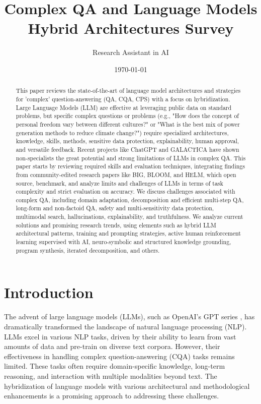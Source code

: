 \documentclass{article}
\title{Complex QA and Language Models Hybrid Architectures Survey}
\author{Research Assistant in AI }
\date{\today}
\begin{document}
\maketitle

\begin{abstract}
This paper reviews the state-of-the-art of language model architectures and strategies for 'complex' question-answering (QA, CQA, CPS) with a focus on hybridization. Large Language Models (LLM) are effective at leveraging public data on standard problems, but specific complex questions or problems (e.g., "How does the concept of personal freedom vary between different cultures?" or "What is the best mix of power generation methods to reduce climate change?") require specialized architectures, knowledge, skills, methods, sensitive data protection, explainability, human approval, and versatile feedback. Recent projects like ChatGPT and GALACTICA have shown non-specialists the great potential and strong limitations of LLMs in complex QA. This paper starts by reviewing required skills and evaluation techniques, integrating findings from community-edited research papers like BIG, BLOOM, and HELM, which open source, benchmark, and analyze limits and challenges of LLMs in terms of task complexity and strict evaluation on accuracy. We discuss challenges associated with complex QA, including domain adaptation, decomposition and efficient multi-step QA, long-form and non-factoid QA, safety and multi-sensitivity data protection, multimodal search, hallucinations, explainability, and truthfulness. We analyze current solutions and promising research trends, using elements such as hybrid LLM architectural patterns, training and prompting strategies, active human reinforcement learning supervised with AI, neuro-symbolic and structured knowledge grounding, program synthesis, iterated decomposition, and others.
\end{abstract}

\tableofcontents

\section{Introduction}
The advent of large language models (LLMs), such as OpenAI's GPT series \cite{brown2020language}, has dramatically transformed the landscape of natural language processing (NLP). LLMs excel in various NLP tasks, driven by their ability to learn from vast amounts of data and pre-train on diverse text corpora. However, their effectiveness in handling complex question-answering (CQA) tasks remains limited. These tasks often require domain-specific knowledge, long-term reasoning, and interaction with multiple modalities beyond text. The hybridization of language models with various architectural and methodological enhancements is a promising approach to addressing these challenges.
\end{document}
